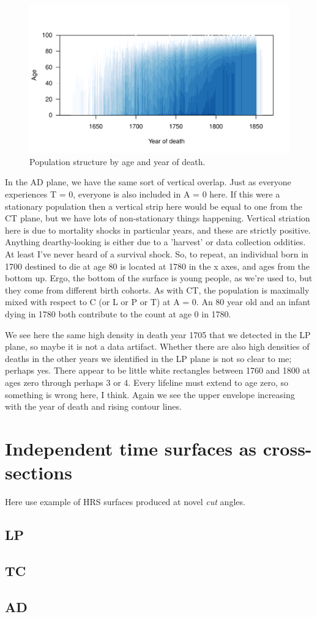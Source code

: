 \begin{figure}
\includegraphics[scale=.9]{Figures/QuebecAD.pdf}
\caption{Population structure by age and year of death.}
\label{fig:adq}
\end{figure}
In the AD plane, we have the same sort of vertical overlap. Just as everyone
experiences T = 0, everyone is also included in A = 0 here. If this were a stationary population then a vertical strip here would be equal to one from the CT plane, but we have lots of non-stationary things happening. Vertical striation here is due to mortality shocks in particular years, and these are strictly positive. Anything dearthy-looking is either due to a 'harvest' or data collection oddities. At least I've never heard of a survival shock. So, to repeat, an individual born in 1700 destined to die at age 80 is located at 1780 in the x axes, and ages from the bottom up. Ergo, the bottom of the surface is young people, as we're used to, but they come from different birth cohorts. As with CT, the population is maximally mixed with respect to C (or L or P or T) at A = 0. An 80 year old and an infant dying in 1780 both contribute to the count at age 0 in 1780.

We see here the same high density in death year 1705 that we detected in the LP
plane, so maybe it is not a data artifact. Whether there are also high densities of deaths in the other years we identified in the LP plane is not so clear to me; perhaps yes. There appear to be little white rectangles between 1760 and 1800 at ages zero through perhaps 3 or 4. Every lifeline must extend to age zero, so something is wrong here, I think. Again we see the upper envelope increasing with the year of death and rising contour lines.

\section{Independent time surfaces as cross-sections}
Here use example of HRS surfaces produced at novel \emph{cut} angles.
\subsection{LP}

\subsection{TC}


\subsection{AD}


  


